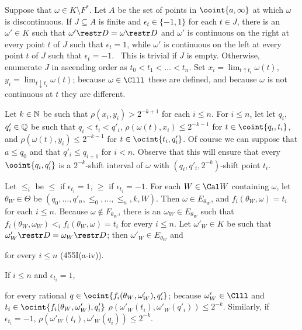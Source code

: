 {\medskip

 Suppose that $\omega\in K\setminus F^*$.
Let $A$ be the set of points in $\ooint{a,\infty}$
at which $\omega$ is discontinuous.   If $J\subseteq A$ is finite and
$\epsilon_t\in\{-1,1\}$ for each $t\in J$,
there is an $\omega'\in K$ such that
$\omega'\restr D=\omega\restr D$ and
$\omega'$ is continuous on the right
at every point $t$ of $J$ such that $\epsilon_t=1$, while
$\omega'$ is continuous on the left
at every point $t$ of $J$ such that $\epsilon_t=-1$.
\Prf\ This is trivial if
$J$ is empty.   Otherwise, enumerate $J$ in ascending order as
$t_0<t_1<\ldots<t_n$.   Set $x_i=\lim_{t\uparrow t_i}\omega(t)$,
$y_i=\lim_{t\downarrow t_i}\omega(t)$;  because $\omega\in\Clll$ these are
defined, and because $\omega$ is not continuous at $t$ they are different.

Let $k\in\Bbb N$ be such that $\rho(x_i,y_i)>2^{-k+1}$ for each
$i\le n$.   For $i\le n$, let
let $q_i$, $q'_i\in\Bbb Q$ be such that
$q_i<t_i<q'_i$, $\rho(\omega(t),x_i)\le 2^{-k-1}$ for
$t\in\coint{q_i,t_i}$,
and $\rho(\omega(t),y_i)\le 2^{-k-1}$ for $t\in\ocint{t_i,q'_i}$.
Of course we
can suppose that $a\le q_0$ and that $q'_i\le q_{i+1}$ for $i<n$.   Observe
that this will ensure that every $\ooint{q_i,q'_i}$ is a
$2^{-k}$-shift interval of $\omega$ with
$(q_i,q'_i,2^{-k})$-shift point $t_i$.

Let $\le_i$ be $\le$ if $\epsilon_{t_i}=1$, $\ge$ if $\epsilon_{t_i}=-1$.
For each $W\in\Cal W$ containing $\omega$,
let $\theta_W\in\Theta$ be
$(q_0,\ldots,q'_n,\le_0,\ldots,\le_n,k,W)$.   Then
$\omega\in E_{\theta_W}$, and $f_i(\theta_W,\omega)=t_i$ for each
$i\le n$.   Because $\omega\notin F_{\theta_W}$, there is
an $\omega_W\in E_{\theta_W}$ such that
$f_i(\theta_W,\omega_W)<_if_i(\theta_W,\omega)=t_i$ for every $i\le n$.
Let $\omega'_W\in K$ be such that $\omega'_W\restr D=\omega_W\restr D$;
then $\omega'_W\in E_{\theta_W}$ and


\noindent for every $i\le n$ (455I(a-iv)).

If $i\le n$ and $\epsilon_{t_i}=1$,


\noindent for every rational $q\in\ocint{f_i(\theta_W,\omega'_W),q'_i}$;
because $\omega'_W\in\Clll$ and
$t_i\in\ocint{f_i(\theta_W,\omega'_W),q'_i}$
$\rho(\omega'_W(t_i),\omega'_W(q'_i))\le 2^{-k}$.   Similarly, if
$\epsilon_{t_i}=-1$, $\rho(\omega'_W(t_i),\omega'_W(q_i))\le 2^{-k}$.

}
